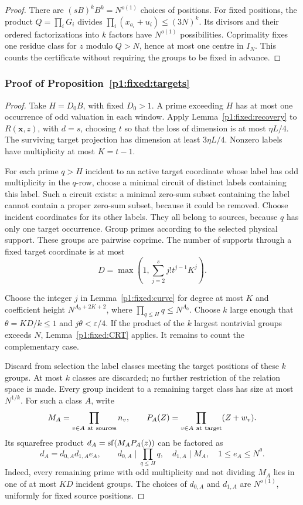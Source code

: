 \begin{proof}
There are \((sB)^kB^k=N^{o(1)}\) choices of positions.
For fixed positions, the product \(Q=\prod_iG_i\) divides
\(\prod_i(x_{a_i}+u_i)\le(3N)^k\). Its divisors and their
ordered factorizations into \(k\) factors have
\(N^{o(1)}\) possibilities. Coprimality fixes one residue
class for \(z\) modulo \(Q>N\), hence at most one centre
in \(I_N\). This counts the certificate without requiring
the groups to be fixed in advance.
\end{proof}

\subsubsection{Proof of Proposition~\ref{p1:fixed:targets}}
\label{p14:comp:fixed-targets}

\begin{proof}
Take \(H=D_0B\), with fixed \(D_0>1\). A prime exceeding
\(H\) has at most one occurrence of odd valuation in each
window. Apply Lemma~\ref{p1:fixed:recovery} to
\(R(\boldsymbol x,z)\), with \(d=s\), choosing \(t\) so that
the loss of dimension is at most \(\eta L/4\).
The surviving target projection has dimension at least
\(3\eta L/4\). Nonzero labels have multiplicity at most
\(K=t-1\).

For each prime \(q>H\) incident to an active target coordinate
whose label has odd multiplicity in the \(q\)-row, choose a
minimal circuit of distinct labels containing this label.
Such a circuit exists: a minimal zero-sum subset containing
the label cannot contain a proper zero-sum subset, because
it could be removed. Choose incident coordinates for its
other labels. They all belong to sources, because \(q\)
has only one target occurrence. Group primes according to
the selected physical support. These groups are pairwise
coprime. The number of supports through a fixed target
coordinate is at most
\[
 D=\max\left(1,\sum_{j=2}^{s}j!t^{j-1}K^j\right).
\]

Choose the integer \(j\) in Lemma~\ref{p1:fixed:curve}
for degree at most \(K\) and coefficient height
\(N^{A_0+2K+2}\), where
\(\prod_{q\le H}q\le N^{A_0}\).
Choose \(k\) large enough that
\(\theta=KD/k\le1\) and \(j\theta<\varepsilon/4\).
If the product of the \(k\) largest nontrivial groups
exceeds \(N\), Lemma~\ref{p1:fixed:CRT} applies. It remains
to count the complementary case.

Discard from selection the label classes meeting the target
positions of these \(k\) groups. At most \(k\) classes are
discarded; no further restriction of the relation space is
made. Every group incident to a remaining target class
has size at most \(N^{1/k}\).
For such a class \(A\), write
\[
 M_A=\prod_{v\in A\ {\rm at\ sources}} n_v,\qquad
 P_A(Z)=\prod_{v\in A\ {\rm at\ target}}(Z+w_v).
\]
Its squarefree product \(d_A=\sf(M_AP_A(z))\) can be
factored as
\[
 d_A=d_{0,A}d_{1,A}e_A,\qquad
 d_{0,A}\mid\prod_{q\le H}q,\quad
 d_{1,A}\mid M_A,\quad 1\le e_A\le N^\theta .
\]
Indeed, every remaining prime with odd multiplicity and
not dividing \(M_A\) lies in one of at most \(KD\) incident
groups. The choices of \(d_{0,A}\) and \(d_{1,A}\) are
\(N^{o(1)}\), uniformly for fixed source positions.


\end{proof}
